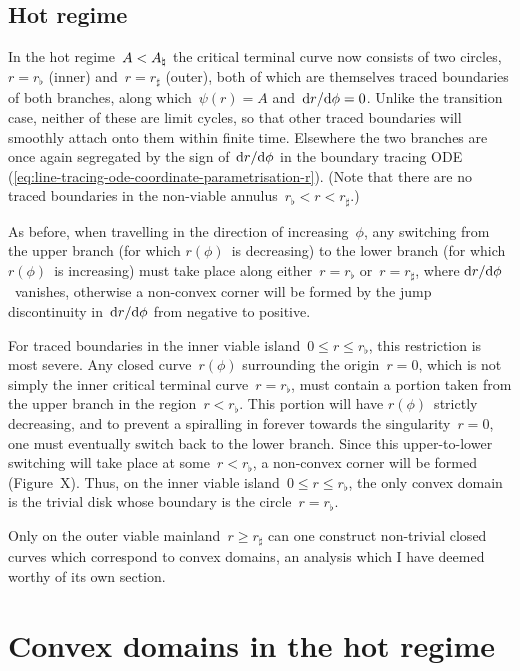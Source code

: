 \subsection{Hot regime}
\label{sec:polar.tracing.hot}

In the hot regime~$A < A_\natural$
the critical terminal curve now consists of two circles,
$r = r_\flat$ (inner) and~$r = r_\sharp$ (outer),
both of which are themselves traced boundaries of both branches,
along which~$\psi (r) = A$ and~$\mathop{}\!\mathrm{d} r / {\mathop{}\!\mathrm{d}\phi} = 0$.
Unlike the transition case,
neither of these are limit cycles,
so that other traced boundaries will smoothly attach onto them
within finite time.
Elsewhere the two branches are once again segregated
by the sign of~$\mathop{}\!\mathrm{d} r / {\mathop{}\!\mathrm{d}\phi}$ in the boundary tracing ODE~%
  (\ref{eq:line-tracing-ode-coordinate-parametrisation-r}).
(Note that there are no traced boundaries
in the non-viable annulus~$r_\flat < r < r_\sharp$.)

As before, when travelling in the direction of increasing~$\phi$,
any switching from the upper branch (for which $r (\phi)$~is decreasing)
to the lower branch (for which $r (\phi)$~is increasing)
must take place along either~$r = r_\flat$ or~$r = r_\sharp$,
where $\mathop{}\!\mathrm{d} r / {\mathop{}\!\mathrm{d}\phi}$~vanishes,
otherwise a non-convex corner will be formed
by the jump discontinuity in~$\mathop{}\!\mathrm{d} r / {\mathop{}\!\mathrm{d}\phi}$
from negative to positive.

For traced boundaries in the inner viable island~$0 \le r \le r_\flat$,
this restriction is most severe.
Any closed curve~$r (\phi)$ surrounding the origin~$r = 0$,
which is not simply the inner critical terminal curve~$r = r_\flat$,
must contain a portion taken from the upper branch
in the region~$r < r_\flat$.
This portion will have $r (\phi)$~strictly decreasing,
and to prevent a spiralling in forever
towards the singularity~$r = 0$,
one must eventually switch back to the lower branch.
Since this upper-to-lower switching will take place at some~$r < r_\flat$,
a non-convex corner will be formed
(Figure~X). %
Thus, on the inner viable island~$0 \le r \le r_\flat$,
the only convex domain is the trivial disk
whose boundary is the circle~$r = r_\flat$.

Only on the outer viable mainland~$r \ge r_\sharp$
can one construct non-trivial closed curves
which correspond to convex domains,
an analysis which I have deemed worthy of its own section.

\section{Convex domains in the hot regime}
\label{sec:line.convex}

